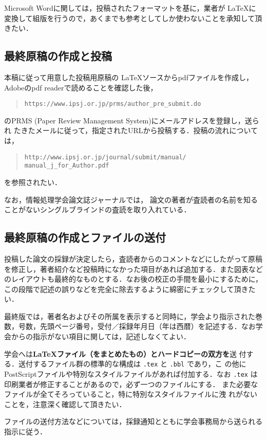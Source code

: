 \documentclass[submit,techrep,noauthor]{ipsj}
\def\|{\verb|}
\begin{document}
Microsoft Wordに関しては，投稿されたフォーマットを基に，業者が \LaTeX に
変換して組版を行うので，あくまでも参考としてしか使わないことを承知して頂
きたい．

%2.2
\subsection{最終原稿の作成と投稿}

本稿に従って用意した投稿用原稿の \LaTeX ソースからpdfファイルを作成し，
Adobeのpdf readerで読めることを確認した後，
\begin{quote}
    \small
    \|https://www.ipsj.or.jp/prms/author_pre_submit.do|
\end{quote}
のPRMS (Paper Review Management System)にメールアドレスを登録し，送られ
たきたメールに従って，指定されたURLから投稿する．投稿の流れについては，
\begin{quote}
    \small
    \|http://www.ipsj.or.jp/journal/submit/manual/|
    \|manual_j_for_Author.pdf|
\end{quote}
を参照されたい．

なお，情報処理学会論文誌ジャーナルでは，
論文の著者が査読者の名前を知ることがないシングルブラインドの査読を取り入れている．

\subsection{最終原稿の作成とファイルの送付}

投稿した論文の採録が決定したら，査読者からのコメントなどにしたがって原稿
を修正し，著者紹介など投稿時になかった項目があれば追加する．また図表など
のレイアウトも最終的なものとする．なお後の校正の手間を最小にするために，
この段階で記述の誤りなどを完全に除去するように綿密にチェックして頂きたい．

最終版では，著者名およびその所属を表示すると同時に，学会より指示された巻
数，号数，先頭ページ番号，受付／採録年月日（年は西暦）を記述する．なお学
会からの指示がない項目に関しては，記述しなくてよい．

学会へは{\bf \LaTeX ファイル（をまとめたもの）とハードコピーの双方を}送
付する．送付するファイル群の標準的な構成は \|.tex| と \|.bbl| であり，こ
の他にPostScriptファイルや特別なスタイルファイルがあれば付加する．なお
\|.tex| は印刷業者が修正することがあるので，{必ず一つのファイルにする}．
また必要なファイルが全てそろっていること，特に特別なスタイルファイルに洩
れがないことを，注意深く確認して頂きたい．

ファイルの送付方法などについては，採録通知とともに学会事務局から送られる
指示に従う．
\end{document}
